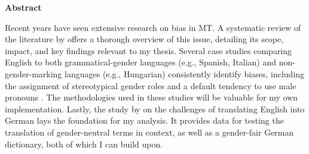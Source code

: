 \thispagestyle{empty}


\vspace*{1cm}

\begin{center}
    \textbf{Abstract}
\end{center}

\vspace*{1cm}

\noindent 
Recent years have seen extensive research on bias in MT. A systematic review of the literature by \citeauthor{shresthaExploringGenderBiases2022} offers a thorough overview of this issue, detailing its scope, impact, and key findings relevant to my thesis. Several case studies comparing English to both grammatical-gender languages (e.g., Spanish, Italian) and non-gender-marking languages (e.g., Hungarian) consistently identify biases, including the assignment of stereotypical gender roles and a default tendency to use male pronouns \cite{stanovskyEvaluatingGenderBias2019,pratesAssessingGenderBias2019,smacchiaDoesAIReflect2024}. The methodologies used in these studies will be valuable for my own implementation. Lastly, the study by \citeauthor{lardelliBuildingBridgesDataset2024} on the challenges of translating English into German lays the foundation for my analysis. It provides data for testing the translation of gender-neutral terms in context, as well as a gender-fair German dictionary, both of which I can build upon.
